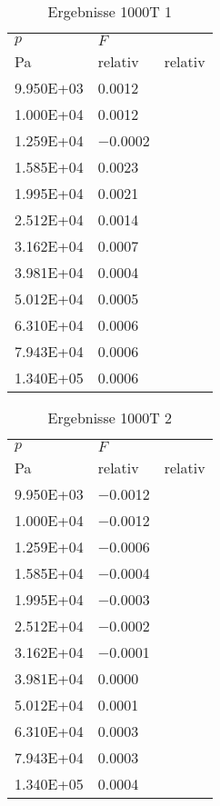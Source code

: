 \begin{table}\begin{tabular}{l l }
\toprule
$p$&$F$\\
 Pa & relativ & relativ\\\midrule
\num{9.950E+03}&\num{0.0012}\\
\num{1.000E+04}&\num{0.0012}\\
\num{1.259E+04}&\num{-0.0002}\\
\num{1.585E+04}&\num{0.0023}\\
\num{1.995E+04}&\num{0.0021}\\
\num{2.512E+04}&\num{0.0014}\\
\num{3.162E+04}&\num{0.0007}\\
\num{3.981E+04}&\num{0.0004}\\
\num{5.012E+04}&\num{0.0005}\\
\num{6.310E+04}&\num{0.0006}\\
\num{7.943E+04}&\num{0.0006}\\
\num{1.340E+05}&\num{0.0006}\\
\bottomrule
\end{tabular}\caption{Ergebnisse 1000T 1}\end{table}\begin{table}\begin{tabular}{l l }
\toprule
$p$&$F$\\
 Pa & relativ & relativ\\\midrule
\num{9.950E+03}&\num{-0.0012}\\
\num{1.000E+04}&\num{-0.0012}\\
\num{1.259E+04}&\num{-0.0006}\\
\num{1.585E+04}&\num{-0.0004}\\
\num{1.995E+04}&\num{-0.0003}\\
\num{2.512E+04}&\num{-0.0002}\\
\num{3.162E+04}&\num{-0.0001}\\
\num{3.981E+04}&\num{0.0000}\\
\num{5.012E+04}&\num{0.0001}\\
\num{6.310E+04}&\num{0.0003}\\
\num{7.943E+04}&\num{0.0003}\\
\num{1.340E+05}&\num{0.0004}\\
\bottomrule
\end{tabular}\caption{Ergebnisse 1000T 2}\end{table}\begin{table}\begin{tabular}{l l }

\end{tabular}
\end{table}
